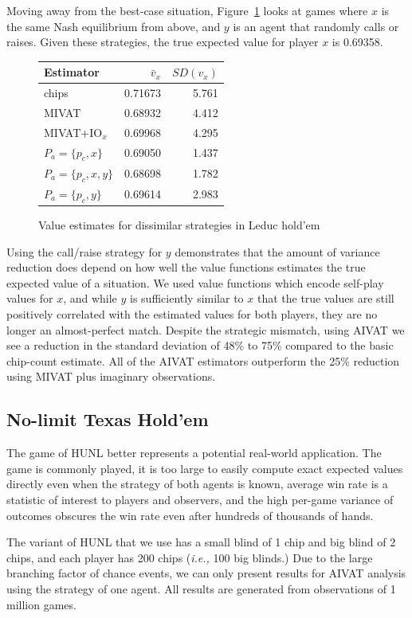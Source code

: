 \documentclass[letterpaper]{article}
\def\VAT{AIVAT}
\def\leduc{Leduc hold'em}
\def\Texas{Texas Hold'em}
\newcommand{\ie}{{\it i.e., }}
\begin{document}
Moving away from the best-case situation, Figure~\ref{fig:leduc_asymm}
looks at games where $x$ is the same Nash equilibrium from above, and
$y$ is an agent that randomly calls or raises. Given these strategies,
the true expected value for player $x$ is 0.69358.

\begin{figure}[!ht]
\centering
\begin{tabular}{|l||r|r|}
\hline
Estimator & $\bar{v}_x$ & $SD(v_x)$ \\
\hline
chips & 0.71673 & 5.761 \\
MIVAT & 0.68932 & 4.412 \\
MIVAT+IO$_x$ & 0.69968 & 4.295 \\
$P_a=\{p_c, x\}$ & 0.69050 & 1.437 \\
$P_a=\{p_c, x, y\}$ & 0.68698 & 1.782 \\
$P_a=\{p_c, y\}$ & 0.69614 & 2.983 \\
\hline
\end{tabular}
\caption{Value estimates for dissimilar strategies in \leduc{}}
\label{fig:leduc_asymm}
\end{figure}

Using the call/raise strategy for $y$ demonstrates that the amount of
variance reduction does depend on how well the value functions
estimates the true expected value of a situation. We used value
functions which encode self-play values for $x$, and while $y$ is
sufficiently similar to $x$ that the true values are still positively
correlated with the estimated values for both players, they are no
longer an almost-perfect match. Despite the strategic mismatch,
using \VAT{} we see a reduction in the standard deviation of 48\% to
75\% compared to the basic chip-count estimate. All of the \VAT{}
estimators outperform the 25\% reduction using MIVAT plus imaginary
observations.


\subsection{No-limit \Texas{}}
The game of HUNL better represents a potential real-world
application. The game is commonly played, it is too large to easily
compute exact expected values directly even when the strategy of both
agents is known, average win rate is a statistic of interest to
players and observers, and the high per-game variance of outcomes
obscures the win rate even after hundreds of thousands of hands.

The variant of HUNL that we use has a small blind of 1 chip and big
blind of 2 chips, and each player has 200 chips (\ie 100 big blinds.)
Due to the large branching factor of chance events, we can only
present results for \VAT{} analysis using the strategy of one
agent. All results are generated from observations of 1 million
games.
\end{document}
